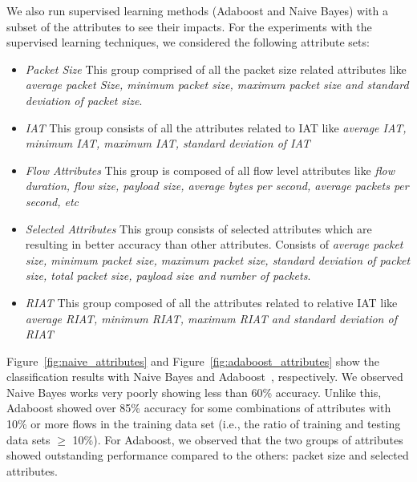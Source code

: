 \documentclass[conference]{IEEEtran}
\begin{document}
We also run supervised learning methods (Adaboost and Naive Bayes) with a subset of the attributes to see their impacts.
For the experiments with the supervised learning techniques, we considered the following attribute sets:

\begin{itemize}
    \item \emph{Packet Size} This group comprised of all the packet size related attributes like \emph{average packet Size, minimum packet size, maximum packet size and standard deviation of packet size}.
    \item \emph{IAT} This group consists of all the attributes related to IAT like \emph{average IAT, minimum IAT, maximum IAT, standard deviation of IAT}
    \item \emph{Flow Attributes} This group is composed of all flow level attributes like \emph{flow duration, flow size, payload size, average bytes per second, average packets per second, etc}
    \item \emph{Selected Attributes} This group consists of selected attributes which are resulting in better accuracy than other attributes. Consists of \emph{average packet size, minimum packet size, maximum packet size, standard deviation of packet size, total packet size, payload size and number of packets}. 
    \item \emph{RIAT} This group composed of all the attributes related to relative IAT like \emph{average RIAT, minimum RIAT, maximum RIAT and standard deviation of RIAT}
\end{itemize}

Figure~\ref{fig:naive_attributes} and Figure~\ref{fig:adaboost_attributes} show the classification results with Naive Bayes and Adaboost~\cite{freund1995desicion}, respectively.
We observed Naive Bayes works very poorly showing less than 60\% accuracy.
Unlike this, Adaboost showed over 85\% accuracy for some combinations of attributes with 10\% or more flows in the training data set (i.e., the ratio of training and testing data sets $\ge$ 10\%).
For Adaboost, we observed that the two groups of attributes showed outstanding performance compared to the others: packet size and selected attributes.


\end{document}
